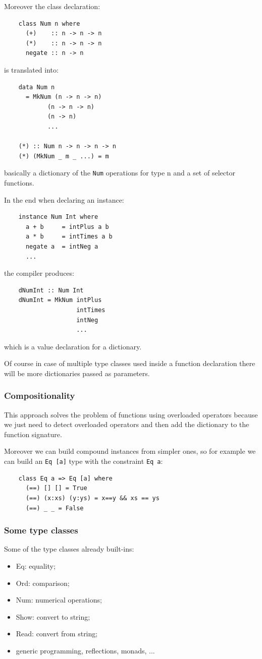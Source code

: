 Moreover the class declaration:
\begin{verbatim}
    class Num n where
      (+)    :: n -> n -> n
      (*)    :: n -> n -> n
      negate :: n -> n
\end{verbatim}
is translated into:
\begin{verbatim}
    data Num n
      = MkNum (n -> n -> n)
            (n -> n -> n)
            (n -> n)
            ...

    (*) :: Num n -> n -> n -> n
    (*) (MkNum _ m _ ...) = m
\end{verbatim}
basically a dictionary of the \verb|Num| operations for type n and a set of selector functions.

In the end when declaring an instance:
\begin{verbatim}
    instance Num Int where
      a + b     = intPlus a b
      a * b     = intTimes a b
      negate a  = intNeg a
      ...
\end{verbatim}
the compiler produces:
\begin{verbatim}
    dNumInt :: Num Int
    dNumInt = MkNum intPlus
                    intTimes
                    intNeg
                    ...
\end{verbatim}
which is a value declaration for a dictionary.

Of course in case of multiple type classes used inside a function declaration there will be more dictionaries passed as parameters.

\subsubsection{Compositionality}
This approach solves the problem of functions using overloaded operators because we just need to detect overloaded operators and then add the dictionary to the function signature.

Moreover we can build compound instances from simpler ones, so for example we can build an \verb|Eq [a]| type with the constraint \verb|Eq a|:
\begin{verbatim}
    class Eq a => Eq [a] where
      (==) [] [] = True
      (==) (x:xs) (y:ys) = x==y && xs == ys
      (==) _ _ = False
\end{verbatim}


\subsubsection{Some type classes}
Some of the type classes already built-ins:
\begin{itemize}
    \item Eq: equality;
    \item Ord: comparison;
    \item Num: numerical operations;
    \item Show: convert to string;
    \item Read: convert from string;
    \item generic programming, reflections, monads, ...
\end{itemize}

